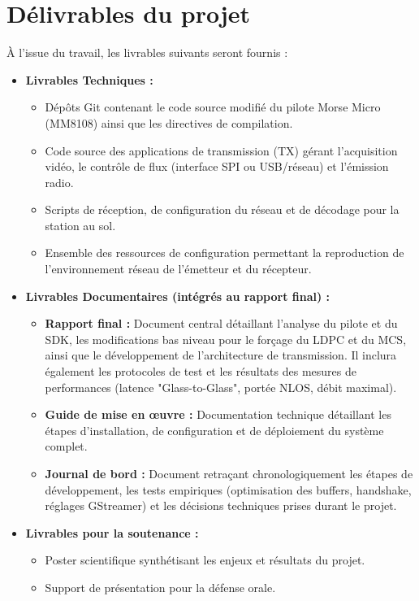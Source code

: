 \section{Délivrables du projet}
À l'issue du travail, les livrables suivants seront fournis :

\begin{itemize}
    \item \textbf{Livrables Techniques :}
    \begin{itemize}
        \item Dépôts Git contenant le code source modifié du pilote Morse Micro (MM8108) ainsi que les directives de compilation.
        \item Code source des applications de transmission (TX) gérant l'acquisition vidéo, le contrôle de flux (interface SPI ou USB/réseau) et l'émission radio.
        \item Scripts de réception, de configuration du réseau et de décodage pour la station au sol.
        \item Ensemble des ressources de configuration permettant la reproduction de l'environnement réseau de l'émetteur et du récepteur.
    \end{itemize}
    
    \item \textbf{Livrables Documentaires (intégrés au rapport final) :}
    \begin{itemize}
        \item \textbf{Rapport final :} Document central détaillant l'analyse du pilote et du SDK, les modifications bas niveau pour le forçage du LDPC et du MCS, ainsi que le développement de l'architecture de transmission. 
        Il inclura également les protocoles de test et les résultats des mesures de performances (latence "Glass-to-Glass", portée NLOS, débit maximal).
        \item \textbf{Guide de mise en œuvre :} Documentation technique détaillant les étapes d'installation, de configuration et de déploiement du système complet.
        \item \textbf{Journal de bord :} Document retraçant chronologiquement les étapes de développement, les tests empiriques (optimisation des buffers, handshake, réglages GStreamer) et les décisions techniques prises durant le projet.
    \end{itemize}
    
    \item \textbf{Livrables pour la soutenance :}
    \begin{itemize}
        \item Poster scientifique synthétisant les enjeux et résultats du projet.
        \item Support de présentation pour la défense orale.
    \end{itemize}
\end{itemize}